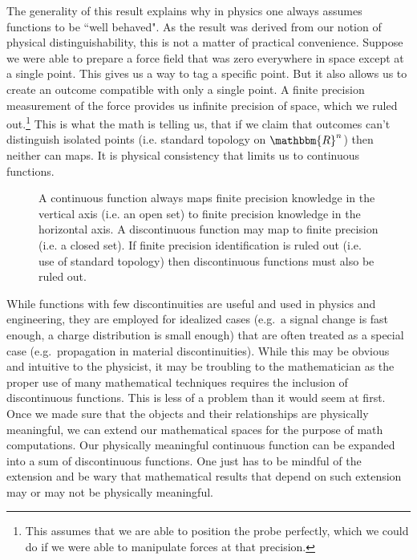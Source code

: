 \documentclass[aps,pra,10pt,twocolumn,floatfix,nofootinbib]{revtex4-1}
\numberwithin{equation}{section}
\theoremstyle{definition}
\begin{document}
The generality of this result explains why in physics one always assumes functions to be ``well behaved". As the result was derived from our notion of physical distinguishability, this is not a matter of practical convenience. Suppose we were able to prepare a force field that was zero everywhere in space except at a single point. This gives us a way to tag a specific point. But it also allows us to create an outcome compatible with only a single point. A finite precision measurement of the force provides us infinite precision of space, which we ruled out.\footnote{This assumes that we are able to position the probe perfectly, which we could do if we were able to manipulate forces at that precision.} This is what the math is telling us, that if we claim that outcomes can't distinguish isolated points (i.e. standard topology on $\mathbbm{R}^n$) then neither can maps. It is physical consistency that limits us to continuous functions.

\begin{figure}
	
	\caption{A continuous function always maps finite precision knowledge in the vertical axis (i.e. an open set) to finite precision knowledge in the horizontal axis. A discontinuous function may map to finite precision (i.e. a closed set). If finite precision identification is ruled out (i.e. use of standard topology) then discontinuous functions must also be ruled out.}
	\label{fig:continuity}
\end{figure}

While functions with few discontinuities are useful and used in physics and engineering, they are employed for idealized cases  (e.g.~a signal change is fast enough, a charge distribution is small enough) that are often treated as a special case (e.g.~propagation in material discontinuities). While this may be obvious and intuitive to the physicist, it may be troubling to the mathematician as the proper use of many mathematical techniques requires the inclusion of discontinuous functions. This is less of a problem than it would seem at first. Once we made sure that the objects and their relationships are physically meaningful, we can extend our mathematical spaces for the purpose of math computations. Our physically meaningful continuous function can be expanded into a sum of discontinuous functions. One just has to be mindful of the extension and be wary that mathematical results that depend on such extension may or may not be physically meaningful.
\end{document}
